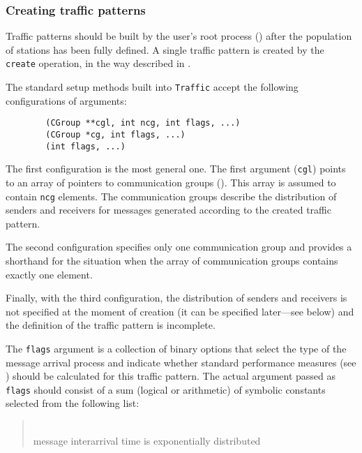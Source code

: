 \subsubsection{Creating traffic patterns}
\label{rm_cl_dt_ct}

Traffic patterns should be built by the user's root process ()
after the population of stations has been fully defined.
A single traffic pattern is created by the {\tt create} operation, in the
way described in .

The standard setup methods built into {\tt Traffic} accept the following
configurations of arguments:

\begin{verbatim}
        (CGroup **cgl, int ncg, int flags, ...)
        (CGroup *cg, int flags, ...)
        (int flags, ...)
\end{verbatim}

The first configuration is the most general one.
The first argument ({\tt cgl}) points to an array of pointers to communication
groups ().
This array is assumed to contain {\tt ncg} elements.
The communication groups describe the distribution of senders and receivers
for messages generated according to the created traffic pattern.

The second configuration specifies only one communication group and provides
a shorthand for the situation when the array of communication groups
contains exactly one element.

Finally, with the third configuration, the distribution of senders and
receivers is not specified at the moment of creation (it can be specified
later---see below) and the definition of the traffic pattern is incomplete.

The {\tt flags} argument is a collection of binary options that select the type
of the message arrival process and indicate whether standard performance
measures (see ) should be calculated for this traffic pattern.
The actual argument passed as {\tt flags} should consist of a sum (logical
or arithmetic) of symbolic constants selected from the following list:

\medskip

\begin{quote}
\noindent{}\\ \hspace{0in}
message interarrival time is exponentially distributed
\end{quote}

